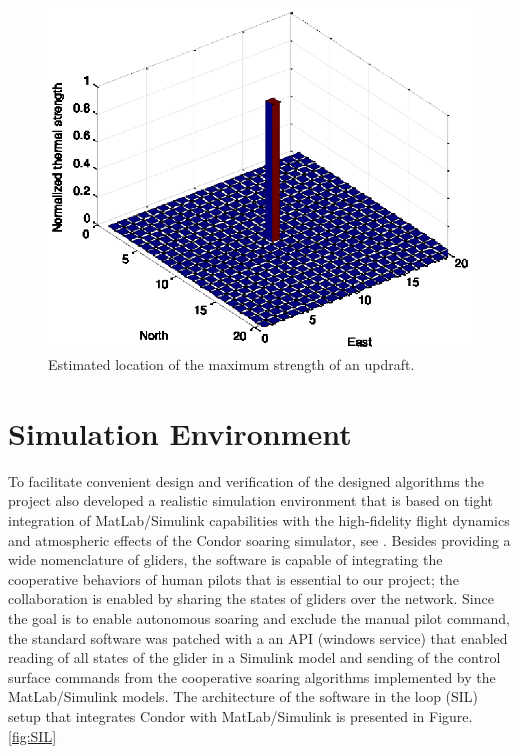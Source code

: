 \documentclass{ifacconf}
\begin{document}
\begin{figure}[thpb]
  \centering
  \includegraphics[scale=0.8]{Figures/pdf.eps}
  \caption{Estimated location of the maximum strength of an updraft.}
  \label{fig:SimPDF}
\end{figure}

\section{Simulation Environment}
\label{sec:SimEnv}
To facilitate convenient design and verification of the designed algorithms the project also developed a realistic simulation environment that is based on tight integration of MatLab/Simulink capabilities with the high-fidelity flight dynamics and atmospheric effects of the Condor soaring simulator, see \cite{Condor:2013:Online}. Besides providing a wide nomenclature of gliders, the software is capable of integrating the cooperative behaviors of human pilots that is essential to our project; the collaboration is enabled by sharing the states of gliders over the network. Since the goal is to enable autonomous soaring and exclude the manual pilot command, the standard software was patched with a an API (windows service) that enabled reading of all states of the glider in a Simulink model and sending of the control surface commands from the cooperative soaring algorithms implemented by the MatLab/Simulink models. The architecture of the software in the loop (SIL) setup that integrates Condor with MatLab/Simulink is presented in Figure.\ref{fig:SIL}
\end{document}
